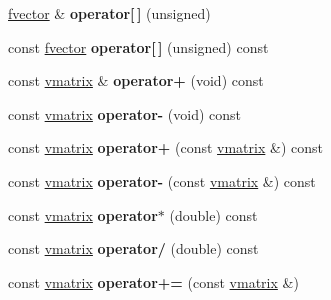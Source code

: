 \begin{DoxyCompactItemize}
\item 
\hyperlink{classfvector}{fvector} \& {\bfseries operator\mbox{[}$\,$\mbox{]}} (unsigned)\hypertarget{classvmatrix_a2bc7c442bf322078c11c7b16b7d54a5e}{}\label{classvmatrix_a2bc7c442bf322078c11c7b16b7d54a5e}

\item 
const \hyperlink{classfvector}{fvector} {\bfseries operator\mbox{[}$\,$\mbox{]}} (unsigned) const \hypertarget{classvmatrix_ae854058c22cb48f4e6409b4571f09bff}{}\label{classvmatrix_ae854058c22cb48f4e6409b4571f09bff}

\item 
const \hyperlink{classvmatrix}{vmatrix} \& {\bfseries operator+} (void) const \hypertarget{classvmatrix_a164b28dd5bbfde67a74ac25861d48104}{}\label{classvmatrix_a164b28dd5bbfde67a74ac25861d48104}

\item 
const \hyperlink{classvmatrix}{vmatrix} {\bfseries operator-\/} (void) const \hypertarget{classvmatrix_a080a724536c5980d7fbe1718a5642e68}{}\label{classvmatrix_a080a724536c5980d7fbe1718a5642e68}

\item 
const \hyperlink{classvmatrix}{vmatrix} {\bfseries operator+} (const \hyperlink{classvmatrix}{vmatrix} \&) const \hypertarget{classvmatrix_abf8b1532417b9d1edc947e859f037efe}{}\label{classvmatrix_abf8b1532417b9d1edc947e859f037efe}

\item 
const \hyperlink{classvmatrix}{vmatrix} {\bfseries operator-\/} (const \hyperlink{classvmatrix}{vmatrix} \&) const \hypertarget{classvmatrix_aeb6b8d3f075fd40fa94e964f2462bfe5}{}\label{classvmatrix_aeb6b8d3f075fd40fa94e964f2462bfe5}

\item 
const \hyperlink{classvmatrix}{vmatrix} {\bfseries operator$\ast$} (double) const \hypertarget{classvmatrix_a81683f271868d9e7bac458c986880edd}{}\label{classvmatrix_a81683f271868d9e7bac458c986880edd}

\item 
const \hyperlink{classvmatrix}{vmatrix} {\bfseries operator/} (double) const \hypertarget{classvmatrix_aaa1b39e46edeb31437778a928dbff261}{}\label{classvmatrix_aaa1b39e46edeb31437778a928dbff261}

\item 
const \hyperlink{classvmatrix}{vmatrix} {\bfseries operator+=} (const \hyperlink{classvmatrix}{vmatrix} \&)\hypertarget{classvmatrix_a5b7100d23e2ef075e815fedba4aaf8ea}{}\label{classvmatrix_a5b7100d23e2ef075e815fedba4aaf8ea}


\end{DoxyCompactItemize}
